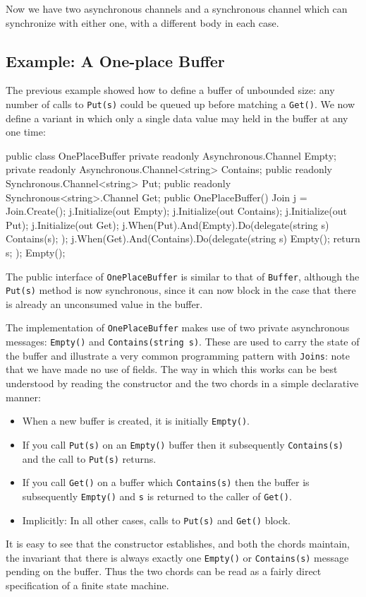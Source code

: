 \documentclass{article}
\newcommand{\joins}{{\texttt{Joins}}}
\begin{document}
Now we have two asynchronous channels  and a synchronous channel which
can synchronize with either one, with a different body in each case.

\subsection{Example: A One-place Buffer}\label{sect:cwoneplacebuffer}
The previous example showed how to define a buffer of unbounded size:
any number of calls to \verb|Put(s)| could be queued up before matching a
\verb|Get()|. We now define a variant in which only a single data value may
held in the buffer at any one time:
\begin{lstcsharp}
  public class OnePlaceBuffer {
    private readonly Asynchronous.Channel Empty;
    private readonly Asynchronous.Channel<string> Contains;
    public readonly Synchronous.Channel<string> Put;
    public readonly Synchronous<string>.Channel Get;
    public OnePlaceBuffer() {
      Join j = Join.Create();
      j.Initialize(out Empty);
      j.Initialize(out Contains);
      j.Initialize(out Put);
      j.Initialize(out Get);
      j.When(Put).And(Empty).Do(delegate(string s) {
        Contains(s);
      });
      j.When(Get).And(Contains).Do(delegate(string s) {
        Empty();
        return s;
      });
      Empty();
    }
  }
\end{lstcsharp}

The public interface of \verb|OnePlaceBuffer| is similar to that of \verb|Buffer|,
although the \verb|Put(s)| method is now synchronous, since it can now block
in the case that there is already an unconsumed value in the buffer.

The implementation of \verb|OnePlaceBuffer| makes use of two private
asynchronous messages: \verb|Empty()| and \verb|Contains(string s)|. These are
used to carry the state of the buffer and illustrate a very common
programming pattern with \joins: note that we have made no use of
fields. The way in which this works can be best understood by reading
the constructor and the two chords in a simple declarative manner:
\begin{itemize}
\item When a new buffer is created, it is initially \verb|Empty()|. 
\item If you call \verb|Put(s)| on an \verb|Empty()| buffer then it subsequently \verb|Contains(s)| and the call to \verb|Put(s)| returns. 
\item If you call \verb|Get()| on a buffer which \verb|Contains(s)| then the buffer is subsequently \verb|Empty()| and \verb|s| is returned to the caller of \verb|Get()|. 
\item Implicitly: In all other cases, calls to \verb|Put(s)| and \verb|Get()| block. 
\end{itemize}
It is easy to see that the constructor establishes, and both the
chords maintain, the invariant that there is always exactly one
\verb|Empty()| or \verb|Contains(s)| message pending on the
buffer. Thus the two chords can be read as a fairly direct
specification of a finite state machine.
\end{document}
